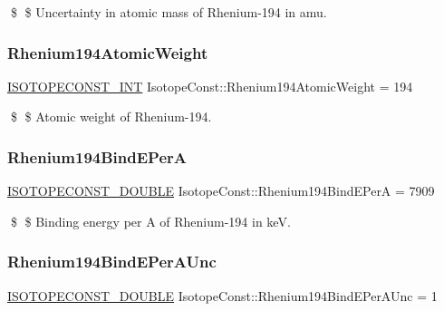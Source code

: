 \$ \$ Uncertainty in atomic mass of Rhenium-\/194 in amu. \mbox{\label{group___isotope_const-_rhenium-_re194_ga93ddd715a6cbddad70ba1b4a765c8037}} 
\subsubsection{\texorpdfstring{Rhenium194\+Atomic\+Weight}{Rhenium194AtomicWeight}}
{\footnotesize\ttfamily \mbox{\hyperlink{group___isotope_const-_macros_ga5f18360b3e99483a35c32d789e62621c}{I\+S\+O\+T\+O\+P\+E\+C\+O\+N\+S\+T\+\_\+\+I\+NT}} Isotope\+Const\+::\+Rhenium194\+Atomic\+Weight = 194}

\$ \$ Atomic weight of Rhenium-\/194. \mbox{\label{group___isotope_const-_rhenium-_re194_gae73a330e4c0e6d16327cde2e46192500}} 
\subsubsection{\texorpdfstring{Rhenium194\+Bind\+E\+PerA}{Rhenium194BindEPerA}}
{\footnotesize\ttfamily \mbox{\hyperlink{group___isotope_const-_macros_ga8f45a7272ce02c0b4c65c44636ed719a}{I\+S\+O\+T\+O\+P\+E\+C\+O\+N\+S\+T\+\_\+\+D\+O\+U\+B\+LE}} Isotope\+Const\+::\+Rhenium194\+Bind\+E\+PerA = 7909}

\$ \$ Binding energy per A of Rhenium-\/194 in keV. \mbox{\label{group___isotope_const-_rhenium-_re194_ga0b8b12c9fd755b754dea0de26f5de371}} 
\subsubsection{\texorpdfstring{Rhenium194\+Bind\+E\+Per\+A\+Unc}{Rhenium194BindEPerAUnc}}
{\footnotesize\ttfamily \mbox{\hyperlink{group___isotope_const-_macros_ga8f45a7272ce02c0b4c65c44636ed719a}{I\+S\+O\+T\+O\+P\+E\+C\+O\+N\+S\+T\+\_\+\+D\+O\+U\+B\+LE}} Isotope\+Const\+::\+Rhenium194\+Bind\+E\+Per\+A\+Unc = 1}

